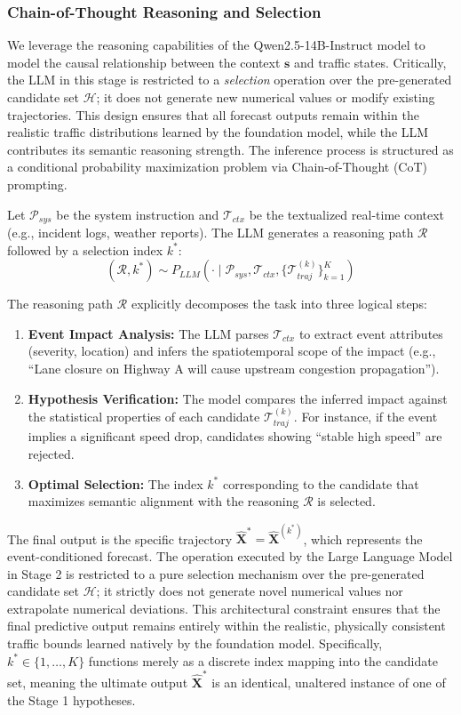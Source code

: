 \documentclass{article}
\begin{document}
\subsubsection{Chain-of-Thought Reasoning and Selection}
We leverage the reasoning capabilities of the Qwen2.5-14B-Instruct model \cite{qwen} to model the causal relationship between the context $\mathbf{s}$ and traffic states. Critically, the LLM in this stage is restricted to a \textit{selection} operation over the pre-generated candidate set $\mathcal{H}$; it does not generate new numerical values or modify existing trajectories. This design ensures that all forecast outputs remain within the realistic traffic distributions learned by the foundation model, while the LLM contributes its semantic reasoning strength. The inference process is structured as a conditional probability maximization problem via Chain-of-Thought (CoT) prompting.

Let $\mathcal{P}_{sys}$ be the system instruction and $\mathcal{T}_{ctx}$ be the textualized real-time context (e.g., incident logs, weather reports). The LLM generates a reasoning path $\mathcal{R}$ followed by a selection index $k^*$:
\begin{equation}
    (\mathcal{R}, k^*) \sim P_{LLM}(\cdot \mid \mathcal{P}_{sys}, \mathcal{T}_{ctx}, \{\mathcal{T}_{traj}^{(k)}\}_{k=1}^K)
\end{equation}

The reasoning path $\mathcal{R}$ explicitly decomposes the task into three logical steps:
\begin{enumerate}
    \item \textbf{Event Impact Analysis:} The LLM parses $\mathcal{T}_{ctx}$ to extract event attributes (severity, location) and infers the spatiotemporal scope of the impact (e.g., ``Lane closure on Highway A will cause upstream congestion propagation'').
    \item \textbf{Hypothesis Verification:} The model compares the inferred impact against the statistical properties of each candidate $\mathcal{T}_{traj}^{(k)}$. For instance, if the event implies a significant speed drop, candidates showing ``stable high speed'' are rejected.
    \item \textbf{Optimal Selection:} The index $k^*$ corresponding to the candidate that maximizes semantic alignment with the reasoning $\mathcal{R}$ is selected.
\end{enumerate}
The final output is the specific trajectory $\hat{\mathbf{X}}^* = \hat{\mathbf{X}}^{(k^*)}$, which represents the event-conditioned forecast. The operation executed by the Large Language Model in Stage 2 is restricted to a pure selection mechanism over the pre-generated candidate set $\mathcal{H}$; it strictly does not generate novel numerical values nor extrapolate numerical deviations. This architectural constraint ensures that the final predictive output remains entirely within the realistic, physically consistent traffic bounds learned natively by the foundation model. Specifically, $k^* \in \{1, \dots, K\}$ functions merely as a discrete index mapping into the candidate set, meaning the ultimate output $\hat{\mathbf{X}}^*$ is an identical, unaltered instance of one of the Stage 1 hypotheses.
\end{document}
